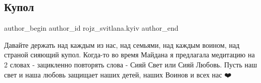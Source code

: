  
 
 
 
 
 
\subsection{Купол}
\label{sec:27_02_2022.fb.rojz_svitlana.kyiv.5.kupol}
 
\ifcmt
 author_begin
   author_id rojz_svitlana.kyiv
 author_end
\fi

Давайте держать над каждым из нас, над семьями, над каждым воином, над страной
сияющий купол. Когда-то во время Майдана я предлагала медитацию на 2 словах -
зацикленно повторять слова - Сияй Свет или Сияй Любовь. Пусть наш свет и наша
любовь защищает наших детей, наших Воинов и всех нас ❤️

